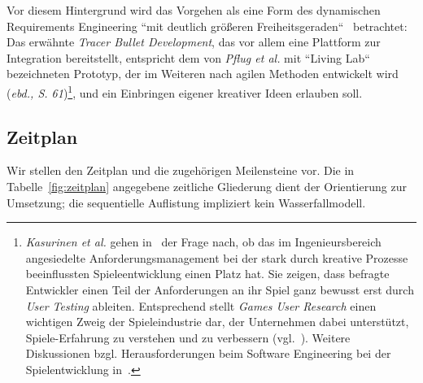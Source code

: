 Vor diesem Hintergrund wird das Vorgehen als eine Form des dynamischen Requirements Engineering ``mit deutlich größeren Freiheitsgeraden``~\cite[60]{MRP21} betrachtet: Das erwähnte \textit{Tracer Bullet Development}, das vor allem eine Plattform zur Integration bereitstellt, entspricht dem von \textit{Pflug et al.} mit ``Living Lab`` bezeichneten Prototyp, der im Weiteren nach agilen Methoden entwickelt wird (\textit{ebd., S. 61})\footnote{
    \textit{Kasurinen et al.} gehen in~\cite[]{KMS14} der Frage nach, ob das im Ingenieursbereich angesiedelte Anforderungsmanagement bei der stark durch kreative Prozesse beeinflussten Spieleentwicklung einen Platz hat. Sie zeigen, dass befragte Entwickler einen Teil der Anforderungen an ihr Spiel ganz bewusst erst durch \textit{User Testing} ableiten. Entsprechend stellt \textit{Games User Research} einen wichtigen Zweig der Spieleindustrie dar, der Unternehmen dabei unterstützt, Spiele-Erfahrung zu verstehen und zu verbessern (vgl.~\cite[26]{Zam18}). Weitere Diskussionen bzgl. Herausforderungen beim Software Engineering bei der Spielentwicklung in~\cite[]{KH09}.
}, und ein Einbringen eigener kreativer Ideen erlauben soll.\\

\subsection{Zeitplan}

Wir stellen den Zeitplan und die zugehörigen Meilensteine vor.
Die in Tabelle~\ref{fig:zeitplan} angegebene zeitliche Gliederung dient der Orientierung zur Umsetzung; die sequentielle Auflistung impliziert kein Wasserfallmodell.

